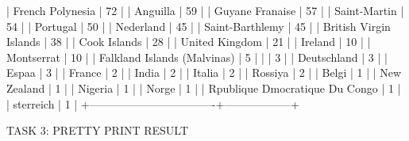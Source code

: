 |         French Polynesia         |        72        |
|             Anguilla             |        59        |
|         Guyane Franaise          |        57        |
|           Saint-Martin           |        54        |
|             Portugal             |        50        |
|            Nederland             |        45        |
|         Saint-Barthlemy          |        45        |
|      British Virgin Islands      |        38        |
|           Cook Islands           |        28        |
|          United Kingdom          |        21        |
|             Ireland              |        10        |
|            Montserrat            |        10        |
|   Falkland Islands (Malvinas)    |        5         |
|                                  |        3         |
|           Deutschland            |        3         |
|              Espaa               |        3         |
|              France              |        2         |
|              India               |        2         |
|              Italia              |        2         |
|             Rossiya              |        2         |
|              Belgi               |        1         |
|           New Zealand            |        1         |
|             Nigeria              |        1         |
|              Norge               |        1         |
|  Rpublique Dmocratique Du Congo  |        1         |
|            sterreich             |        1         |
+----------------------------------+------------------+


TASK 3: PRETTY PRINT RESULT

